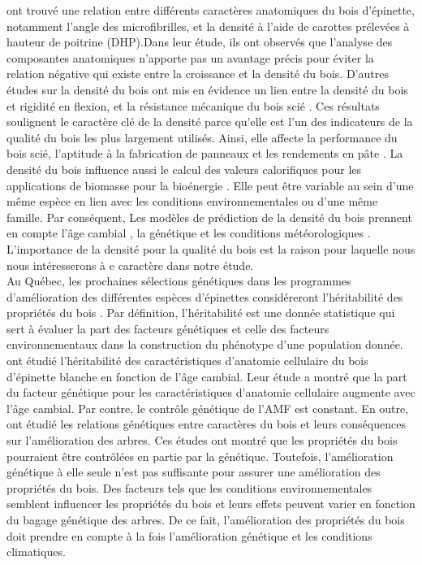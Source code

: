 \documentclass{report}
\begin{document}
\cite{Ivkovich2002} ont trouvé une relation entre différents caractères anatomiques du bois d'épinette, notamment l'angle des microfibrilles, et la densité à l'aide de carottes prélevées à hauteur de poitrine (DHP).Dans leur étude, ils ont observés que l'analyse des composantes anatomiques n'apporte pas un avantage précis pour éviter la relation négative qui existe entre la croissance et la densité du bois. D'autres études sur la densité du bois ont mis en évidence un lien entre la densité du bois et rigidité en flexion, et la résistance mécanique du bois scié \citep{Saranpaa1994,Alteyrac2006}. Ces résultats soulignent le caractère clé de la densité parce qu'elle est l'un des indicateurs de la qualité du bois les plus largement utilisés. Ainsi, elle affecte la performance du bois scié, l'aptitude à la fabrication de panneaux et les rendements en pâte \citep{Macdonald2002}. La densité du bois influence aussi le calcul des valeurs calorifiques pour les applications de biomasse pour la bioénergie \citep{Mckendry2002}. Elle peut être variable au sein d'une même espèce en lien avec les conditions environnementales ou d'une même famille. Par conséquent, Les modèles de prédiction de la densité du bois prennent en compte l'âge cambial \citep{David2014}, la génétique et les conditions météorologiques \citep{Wilkinson2015}. L'importance de la densité pour la qualité du bois est la raison pour laquelle nous nous intéresserons à e caractère dans notre étude. \\

Au Québec, les prochaines sélections génétiques dans les programmes d'amélioration des différentes espèces d'épinettes considéreront l'héritabilité des propriétés du bois \citep{Mullin2011, Beaulieu2009}. Par définition, l'héritabilité est une donnée statistique qui sert à évaluer la part des facteurs génétiques et celle des facteurs environnementaux dans la construction du phénotype d'une population donnée. \cite{Lenz2010} ont étudié l'héritabilité des caractéristiques d'anatomie cellulaire du bois d'épinette blanche en fonction de l'âge cambial. Leur étude a montré que la part du facteur génétique pour les caractéristiques d'anatomie cellulaire augmente avec l'âge cambial. Par contre, le contrôle génétique de l'AMF est constant.  En outre, \cite{Lenz2011} ont étudié les relations génétiques entre caractères du bois et leurs conséquences sur l'amélioration des arbres. Ces études ont montré que les propriétés du bois pourraient être contrôlées en partie par la génétique. Toutefois, l'amélioration génétique à elle seule n'est pas suffisante pour assurer une amélioration des propriétés du bois. Des facteurs tels que les conditions environnementales semblent influencer les propriétés du bois et leurs effets peuvent varier en fonction du bagage génétique des arbres. De ce fait, l'amélioration des propriétés du bois doit prendre en compte à la fois l'amélioration génétique et les conditions climatiques. \\
\end{document}
